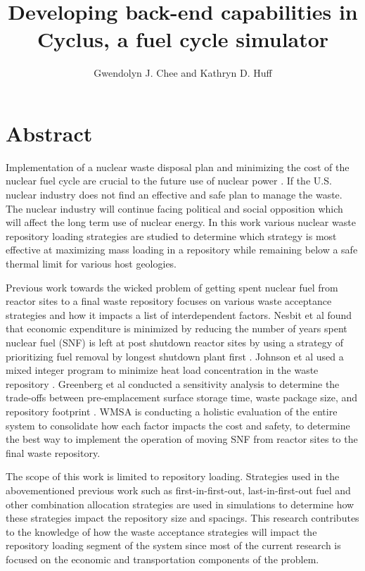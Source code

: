 \documentclass{anstrans}
\title{Developing back-end capabilities in Cyclus, a fuel cycle simulator}
\author{Gwendolyn J. Chee and Kathryn D. Huff}
\institute{
Dept. of Nuclear, Plasma and Radiological Engineering, University of Illinois at Urbana-Champaign \\
gchee2@illinois.edu
}
\begin{document}
\section{Abstract}
Implementation of a nuclear waste disposal plan and minimizing the cost of the 
nuclear fuel cycle are crucial to the future use of nuclear power 
\cite{massachusetts_institute_of_technology_future_2003}. 
If the U.S. nuclear industry does not find an effective and safe plan to manage 
the waste. The nuclear industry will continue facing political and social 
opposition which will affect the long term use of nuclear energy. 
In this work various nuclear waste repository loading strategies are 
studied to determine which strategy is most effective at maximizing 
mass loading in a repository while remaining below a safe thermal limit 
for various host geologies. 

Previous work towards the wicked problem of getting spent nuclear fuel from reactor 
sites to a final waste repository focuses on various waste acceptance strategies 
and how it impacts a list of interdependent factors. 
Nesbit et al found that economic expenditure is minimized by reducing the 
number of years spent nuclear fuel (SNF) is left at post shutdown reactor 
sites by using a strategy of prioritizing fuel removal by longest shutdown plant 
first \cite{nesbit_proposed_2015}. 
Johnson et al used a mixed integer program to minimize heat load concentration 
in the waste repository \cite{johnson_optimizing_2016}. 
Greenberg et al conducted a sensitivity analysis to determine the trade-offs 
between pre-emplacement surface storage time, waste package size, and repository 
footprint \cite{greenberg_application_2012}. 
WMSA is conducting a holistic evaluation of the entire system to consolidate 
how each factor impacts the cost and safety, to determine the best 
way to implement the operation of moving SNF from reactor sites to the final 
waste repository\cite{nutt_waste_2015}. 

The scope of this work is limited to repository loading. 
Strategies used in the abovementioned previous work such as first-in-first-out, 
last-in-first-out fuel and other combination allocation strategies are used 
in simulations to determine how these strategies impact the repository size 
and spacings. 
This research contributes to the knowledge of how the waste acceptance 
strategies will impact the repository loading segment of the system since 
most of the current research is focused on the economic and transportation 
components of the problem. 
\end{document}
